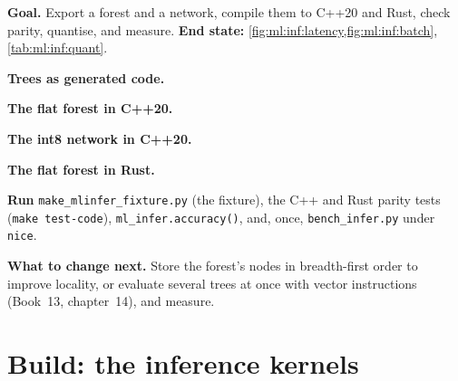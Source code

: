 \begin{tutorial}
\textbf{Goal.} Export a forest and a network, compile them to C++20 and Rust, check parity, quantise, and measure.
\textbf{End state:} \cref{fig:ml:inf:latency,fig:ml:inf:batch}, \cref{tab:ml:inf:quant}.
\begin{tutsteps}
\item \textbf{Trees as generated code.}
\label{lst:ml:inf:gen}
\item \textbf{The flat forest in C++20.}
\label{lst:ml:inf:loop}
\item \textbf{The int8 network in C++20.}
\label{lst:ml:inf:mlp}
\item \textbf{The flat forest in Rust.}
\label{lst:ml:inf:rust}
\item \textbf{Run} \texttt{make\_mlinfer\_fixture.py} (the fixture), the C++ and Rust parity tests (\texttt{make test-code}),
\texttt{ml\_infer.accuracy()}, and, once, \texttt{bench\_infer.py} under \texttt{nice}.
\end{tutsteps}
\textbf{What to change next.} Store the forest's nodes in breadth-first order to improve locality, or evaluate several trees
at once with vector instructions (Book~13, chapter~14), and measure.
\end{tutorial}

\section{Build: the inference kernels}\label{bld:ml:low-latency-inference:mlinfer}

